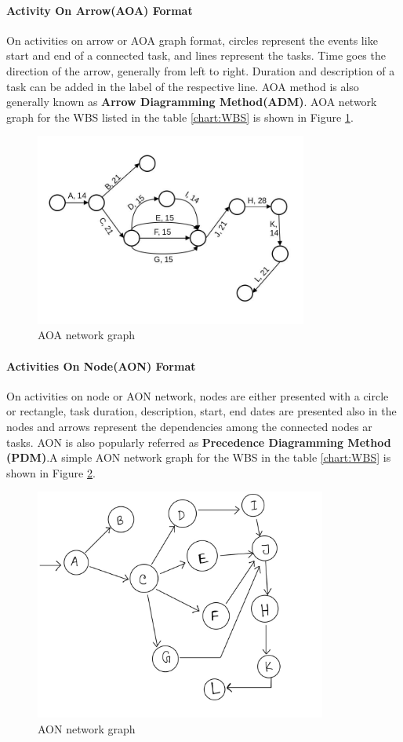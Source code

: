 \begin{spacing}{1}
\paragraph{Activity On Arrow(AOA) Format}
On activities on arrow or AOA graph format, circles represent the events like start and end of a connected task, and lines represent the tasks. Time goes the direction of the arrow, generally from left to right. Duration and description of a task can be added in the label of the respective line. AOA method is also generally known as \textbf{Arrow Diagramming Method(ADM)}. AOA network graph for the  WBS listed in the table \ref{chart:WBS} is shown in Figure \ref{fig:aoa}.

\begin{figure}[H]
	\centering
	\includegraphics[width=0.8\textwidth]{AOA}
	\caption{AOA network graph}
	\label{fig:aoa}
\end{figure} 

\paragraph{Activities On Node(AON) Format}
On activities on node or AON network, nodes are either presented with a circle or rectangle, task duration, description, start, end dates are presented also in the nodes and arrows represent the dependencies among the connected nodes ar tasks. AON is also popularly referred as \textbf{Precedence Diagramming Method (PDM)}.A simple AON network graph for the WBS in the table \ref{chart:WBS} is shown in Figure \ref{fig:aon}.

\begin{figure}[H]
	\centering
	\includegraphics[width=\textwidth, height=3in]{AON}
	\caption{AON network graph}
	\label{fig:aon}
\end{figure} 

\end{spacing}
